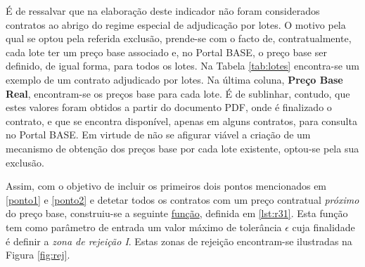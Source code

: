 É de ressalvar que na elaboração deste indicador não foram considerados contratos ao abrigo do regime especial de adjudicação por lotes. O motivo pela qual se optou pela referida exclusão, prende-se com o facto de, contratualmente, cada lote ter um preço base associado e, no Portal BASE, o preço base ser definido, de igual forma, para todos os lotes. Na Tabela \ref{tab:lotes} encontra-se um exemplo de um contrato adjudicado por lotes. Na última coluna, \textbf{Preço Base Real}, encontram-se os preços base para cada lote. É de sublinhar, contudo, que estes valores foram obtidos a partir do documento PDF, onde é finalizado o contrato, e que se encontra disponível, apenas em alguns contratos, para consulta no Portal BASE. Em virtude de não se afigurar viável a criação de um mecanismo de obtenção dos preços base por cada lote existente, optou-se pela sua exclusão.


\begin{table}[H]
	\centering
	\renewcommand{\arraystretch}{1.15}
	\setlength{\tabcolsep}{15pt}
	\caption{Exemplo de um contrato adjudicado por lotes.}
\label{tab:lotes}
\end{table}






Assim, com o objetivo de incluir os primeiros dois pontos mencionados em \ref{ponto1} e \ref{ponto2} e detetar todos os contratos com um preço contratual \textit{próximo} do preço base, construiu-se a seguinte \hyperref[lst:r31]{função}, definida em \ref{lst:r31}. Esta função tem como parâmetro de entrada um valor máximo de tolerância $\epsilon$ cuja finalidade é definir a \textit{zona de rejeição I}. Estas zonas de rejeição encontram-se ilustradas na Figura \ref{fig:rej}.

